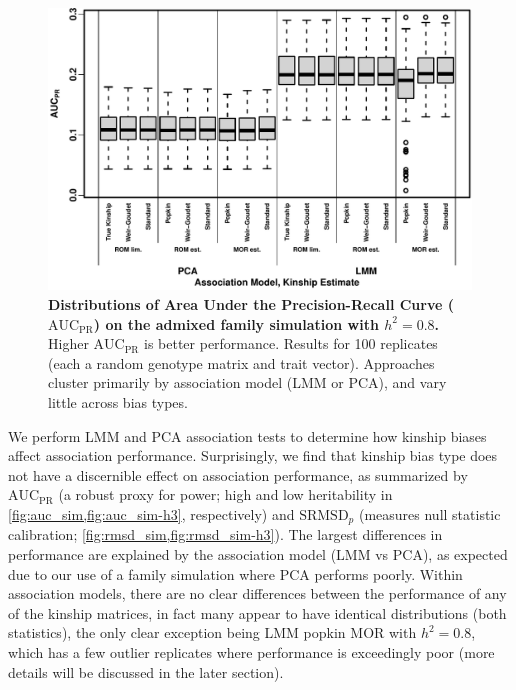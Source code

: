 \documentclass[11pt]{article}
\newcommand{\rmsd}{\text{SRMSD}_p}
\newcommand{\auc}{\text{AUC}_\text{PR}}
\begin{document}
\begin{linenumbers}
\begin{figure}[bp!]
  \centering
  \includegraphics[width=\textwidth]{sim-admix-n1000-m100000-k3-f0.3-s0.5-mc100-h0.8-g20-fes/auc.pdf}
  \caption{
    {\bf Distributions of Area Under the Precision-Recall Curve ($\auc$) on the admixed family simulation with $h^2=0.8$.}
    Higher $\auc$ is better performance.
    Results for 100 replicates (each a random genotype matrix and trait vector).
    Approaches cluster primarily by association model (LMM or PCA), and vary little across bias types.
  }
  \label{fig:auc_sim}
\end{figure}

We perform LMM and PCA association tests to determine how kinship biases affect association performance.
Surprisingly, we find that kinship bias type does not have a discernible effect on association performance, as summarized by $\auc$ (a robust proxy for power; high and low heritability in \cref{fig:auc_sim,fig:auc_sim-h3}, respectively) and $\rmsd$ (measures null statistic calibration; \cref{fig:rmsd_sim,fig:rmsd_sim-h3}).
The largest differences in performance are explained by the association model (LMM vs PCA), as expected due to our use of a family simulation where PCA performs poorly.
Within association models, there are no clear differences between the performance of any of the kinship matrices, in fact many appear to have identical distributions (both statistics), the only clear exception being LMM popkin MOR with $h^2=0.8$, which has a few outlier replicates where performance is exceedingly poor (more details will be discussed in the later section).


\end{linenumbers}
\end{document}
